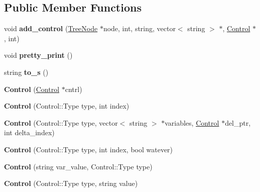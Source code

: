\subsection*{Public Member Functions}
\begin{DoxyCompactItemize}
\item 
\hypertarget{classControl_a3bebd50d64be06d324f460bd6bb3289e}{
void {\bfseries add\_\-control} (\hyperlink{classTreeNode}{TreeNode} $\ast$node, int, string, vector$<$ string $>$ $\ast$, \hyperlink{classControl}{Control} $\ast$, int)}
\label{classControl_a3bebd50d64be06d324f460bd6bb3289e}

\item 
\hypertarget{classControl_a253c2963cf1561f52e3212a2a91dd09a}{
void {\bfseries pretty\_\-print} ()}
\label{classControl_a253c2963cf1561f52e3212a2a91dd09a}

\item 
\hypertarget{classControl_a4c41c3158d8913e39e10f207d59592ff}{
string {\bfseries to\_\-s} ()}
\label{classControl_a4c41c3158d8913e39e10f207d59592ff}

\item 
\hypertarget{classControl_a578b3b8a92a99a8924bbaaa35765caa6}{
{\bfseries Control} (\hyperlink{classControl}{Control} $\ast$cntrl)}
\label{classControl_a578b3b8a92a99a8924bbaaa35765caa6}

\item 
\hypertarget{classControl_aed0474eda3fbba2470cfdd5865cdf95e}{
{\bfseries Control} (Control::Type type, int index)}
\label{classControl_aed0474eda3fbba2470cfdd5865cdf95e}

\item 
\hypertarget{classControl_a6f035fbbd272ba6a877554cb9c46846b}{
{\bfseries Control} (Control::Type type, vector$<$ string $>$ $\ast$variables, \hyperlink{classControl}{Control} $\ast$del\_\-ptr, int delta\_\-index)}
\label{classControl_a6f035fbbd272ba6a877554cb9c46846b}

\item 
\hypertarget{classControl_ac37be7f2ad830c2a56337ae86e8a8e4e}{
{\bfseries Control} (Control::Type type, int index, bool watever)}
\label{classControl_ac37be7f2ad830c2a56337ae86e8a8e4e}

\item 
\hypertarget{classControl_af4d697c95ee5886169013e12ef016f34}{
{\bfseries Control} (string var\_\-value, Control::Type type)}
\label{classControl_af4d697c95ee5886169013e12ef016f34}

\item 
\hypertarget{classControl_a2b72ec8881d3e7261feb61999b5ea8f2}{
{\bfseries Control} (Control::Type type, string value)}
\label{classControl_a2b72ec8881d3e7261feb61999b5ea8f2}


\end{DoxyCompactItemize}
